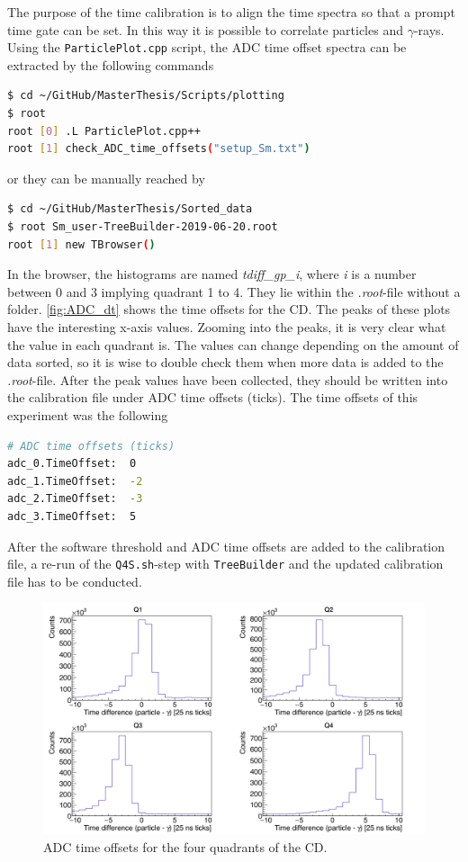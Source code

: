 \documentclass[twoside,english]{uiofysmaster/uiofysmaster}
\newcommand{\ga}{$\gamma$}
\let\orgautoref\autoref
\renewcommand{\autoref}
        {%
		 \def\subsectionautorefname{Section}%
		 \def\subsubsectionautorefname{Section}%
          \orgautoref}
\begin{document}
The purpose of the time calibration is to align the time spectra so that a prompt time gate can be set. In this way it is possible to correlate particles and \ga-rays. Using the \texttt{ParticlePlot.cpp} script, the ADC time offset spectra can be extracted by the following commands
\begin{lstlisting}[language=sh]
$ cd ~/GitHub/MasterThesis/Scripts/plotting
$ root
root [0] .L ParticlePlot.cpp++
root [1] check_ADC_time_offsets("setup_Sm.txt")
\end{lstlisting}
or they can be manually reached by
\begin{lstlisting}[language=sh]
$ cd ~/GitHub/MasterThesis/Sorted_data
$ root Sm_user-TreeBuilder-2019-06-20.root
root [1] new TBrowser()
\end{lstlisting}
In the browser, the histograms are named \textit{tdiff\_gp\_i}, where \textit{i} is a number between 0 and 3 implying quadrant 1 to 4. 
They lie within the \textit{.root}-file without a folder. \autoref{fig:ADC_dt} shows the time offsets for the CD. 
The peaks of these plots have the interesting x-axis values. 
Zooming into the peaks, it is very clear what the value in each quadrant is. 
The values can change depending on the amount of data sorted, so it is wise to double check them when more data is added to the \textit{.root}-file. 
After the peak values have been collected, they should be written into the calibration file under ADC time offsets (ticks). 
The time offsets of this experiment was the following
\begin{lstlisting}[language=sh]
# ADC time offsets (ticks)
adc_0.TimeOffset:  0
adc_1.TimeOffset:  -2
adc_2.TimeOffset:  -3
adc_3.TimeOffset:  5
\end{lstlisting}
After the software threshold and ADC time offsets are added to the calibration file, a re-run of the \texttt{Q4S.sh}-step with \texttt{TreeBuilder} and the updated calibration file has to be conducted.

\begin{figure}[ht]
	\centering
	\includegraphics[width=\textwidth]{../Plots/plotting/tdiff_gp_0-3-user.png}
	\caption{ADC time offsets for the four quadrants of the CD.}
	\label{fig:ADC_dt}
\end{figure}
\end{document}
